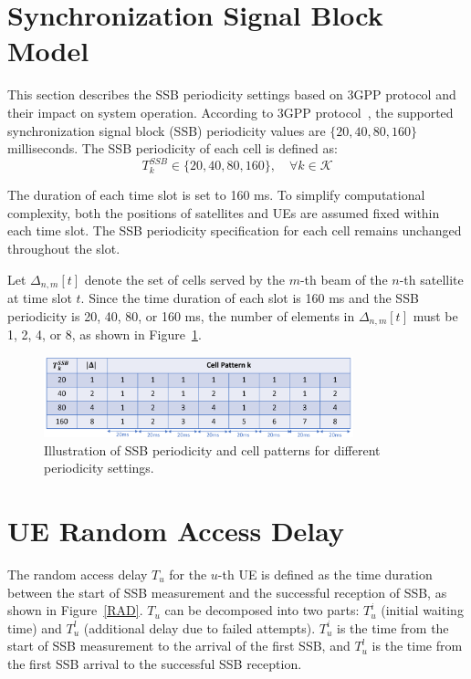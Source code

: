 \section{Synchronization Signal Block Model}
This section describes the SSB periodicity settings based on 3GPP protocol and their impact on system operation. According to 3GPP protocol~\cite{38331}, the supported synchronization signal block (SSB) periodicity values are $\{20, 40, 80, 160\}$ milliseconds. The SSB periodicity of each cell is defined as:
\begin{equation}
    T^{SSB}_{k} \in \{20, 40, 80, 160\}, \quad \forall k \in \mathcal{K}
\end{equation}

The duration of each time slot is set to 160 ms. To simplify computational complexity, both the positions of satellites and UEs are assumed fixed within each time slot. The SSB periodicity specification for each cell remains unchanged throughout the slot.

Let $\Delta_{n,m}[t]$ denote the set of cells served by the $m$-th beam of the $n$-th satellite at time slot $t$. Since the time duration of each slot is 160 ms and the SSB periodicity is 20, 40, 80, or 160 ms, the number of elements in $\Delta_{n,m}[t]$ must be 1, 2, 4, or 8, as shown in Figure~\ref{delta}.

\begin{figure}[h!]
    \centering
    \includegraphics[width=0.8\textwidth]{figure/delta pattern.pdf}
    \caption{Illustration of SSB periodicity and cell patterns for different periodicity settings.}
    \label{delta}
\end{figure}

\section{UE Random Access Delay}
The random access delay $T_u$ for the $u$-th UE is defined as the time duration between the start of SSB measurement and the successful reception of SSB, as shown in Figure~\ref{RAD}. $T_u$ can be decomposed into two parts: $T_u^i$ (initial waiting time) and $T_u^l$ (additional delay due to failed attempts). $T_u^i$ is the time from the start of SSB measurement to the arrival of the first SSB, and $T_u^l$ is the time from the first SSB arrival to the successful SSB reception.

